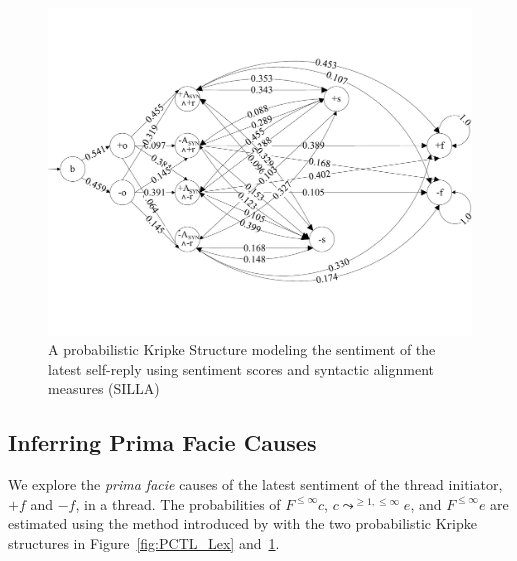 \documentclass[man,biblatex,floatsintext]{apa6}
\newcommand{\up}{\vspace*{-12pt}}
\begin{document}
\begin{figure}[!htb]
 \centering
  \includegraphics[width=0.99\linewidth]{Figures/model_syn.pdf}
  \caption{A probabilistic Kripke Structure modeling the sentiment of the latest self-reply using sentiment scores and syntactic alignment measures (SILLA)}\label{fig:PCTL_Syn}
  \up
\end{figure}


\subsection{Inferring Prima Facie Causes}

We explore the \emph{prima facie} causes of the latest sentiment of the thread initiator, $+f$ and $-f$, in a thread. The probabilities of $F^{\leq \infty }c$, $c\leadsto^{\geq 1,\leq \infty}e$, and $F^{\leq \infty }e$ are estimated using the method introduced by \textcite{kleinberg_uai09} with the two probabilistic Kripke structures in Figure~\ref{fig:PCTL_Lex} and~\ref{fig:PCTL_Syn}. 
\end{document}
